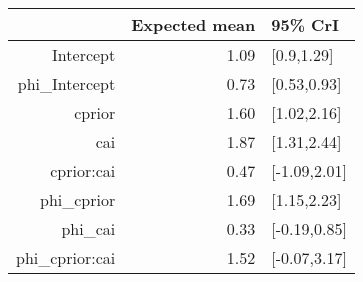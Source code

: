 \begin{tabular}{rrl}
  \hline
 & Expected mean & 95\% CrI \\ 
  \hline
Intercept & 1.09 & [0.9,1.29] \\ 
  phi\_Intercept & 0.73 & [0.53,0.93] \\ 
  cprior & 1.60 & [1.02,2.16] \\ 
  cai & 1.87 & [1.31,2.44] \\ 
  cprior:cai & 0.47 & [-1.09,2.01] \\ 
  phi\_cprior & 1.69 & [1.15,2.23] \\ 
  phi\_cai & 0.33 & [-0.19,0.85] \\ 
  phi\_cprior:cai & 1.52 & [-0.07,3.17] \\ 
   \hline
\end{tabular}

